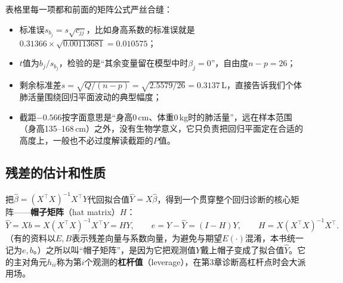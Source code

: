表格里每一项都和前面的矩阵公式严丝合缝：
\begin{itemize}
\item 标准误$s_{b_j}=s\sqrt{c_{jj}}$，比如身高系数的标准误就是$0.31366\times\sqrt{0.00113681}=0.010575$；
\item $t$值为$b_j/s_{b_j}$，检验的是“其余变量留在模型中时$\beta_j=0$”，自由度$n-p=26$；
\item 剩余标准差$s=\sqrt{Q/(n-p)}=\sqrt{2.5579/26}=0.3137$\,L，直接告诉我们个体肺活量围绕回归平面波动的典型幅度；
\item 截距$-0.566$按字面意思是“身高0\,cm、体重0\,kg时的肺活量”，远在样本范围（身高135--168\,cm）之外，没有生物学意义，它只负责把回归平面定在合适的高度上，一般也不必过度解读截距的$P$值。
\end{itemize}

\subsection{残差的估计和性质}\label{sec:resid}
把$\widehat\beta=(X^\top X)^{-1}X^\top Y$代回拟合值$\widehat Y=X\widehat\beta$，得到一个贯穿整个回归诊断的核心矩阵——\textbf{帽子矩阵}（hat matrix）$H$：
\[
\widehat Y=Xb=X(X^\top X)^{-1}X^\top Y=HY,\qquad
e=Y-\widehat Y=(I-H)Y,\qquad
H=X(X^\top X)^{-1}X^\top.
\]
（有的资料以$E,B$表示残差向量与系数向量，为避免与期望$E(\cdot)$混淆，本书统一记为$e,b$。）之所以叫“帽子矩阵”，是因为它把观测值$Y$戴上帽子变成了拟合值$\widehat Y$。它的主对角元$h_{ii}$称为第$i$个观测的\textbf{杠杆值}（leverage），在第3章诊断高杠杆点时会大派用场。


